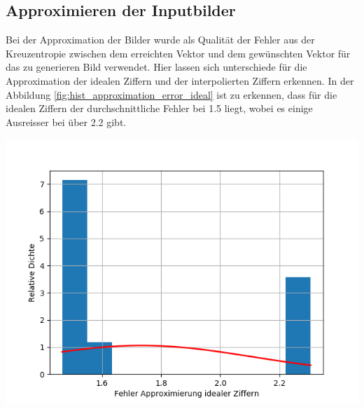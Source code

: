 \documentclass[Interploate_hadwritten_Digits.tex]{subfiles}
\begin{document}
	\subsection{Approximieren der Inputbilder}
	Bei der Approximation der Bilder wurde als Qualität der Fehler aus der Kreuzentropie zwischen dem erreichten Vektor und dem gewünschten Vektor für das zu generieren Bild verwendet. Hier lassen sich unterschiede für die Approximation der idealen Ziffern und der interpolierten Ziffern erkennen. In der Abbildung \ref{fig:hist_approximation_error_ideal} ist zu erkennen, dass für die idealen Ziffern der durchschnittliche Fehler bei 1.5 liegt, wobei es einige Ausreisser bei über 2.2 gibt.
	\begin{Figure}
		\centering
		\includegraphics[width=\linewidth]{img/results/histogram_approximation_error_ideal.png}
		\label{fig:hist_approximation_error_ideal}
	\end{Figure}	
	
\end{document}
